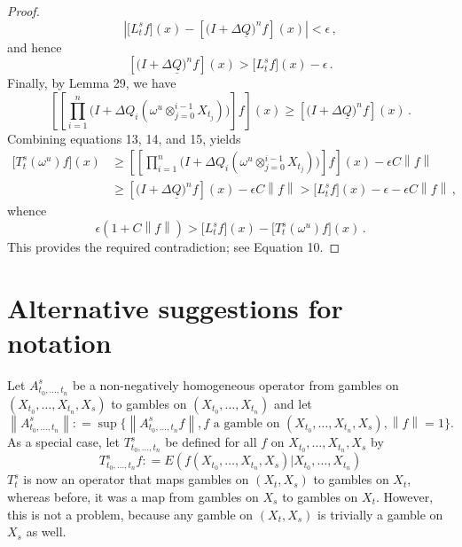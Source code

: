 \documentclass[a4paper,reqno]{amsart}
\newcommand{\lrate}{\underline{Q}}
\newcommand{\norm}[1]{\left\lVert #1 \right\rVert}
\newcommand{\coloneqq}{:\!=}
\begin{document}
\begin{proof}
\begin{equation*}
\left\vert \bigl[L_t^sf\bigr](x) - \left[\bigl(I + \Delta\lrate\bigr)^n f\right](x)\right\vert < \epsilon\,,
\end{equation*}
and hence
\begin{equation}
\left[\bigl(I + \Delta\lrate\bigr)^n f\right](x) > \bigl[L_t^sf\bigr](x) - \epsilon\,.
\end{equation}
Finally, by Lemma 29, we have
\begin{equation}
\left[\left[\prod_{i=1}^n\bigl(I + \Delta Q_i(\omega^u\otimes_{j=0}^{i-1}X_{t_j})\bigr) \right]f\right](x) \geq \left[\bigl(I + \Delta\lrate\bigr)^n f\right](x)\,.
\end{equation}
Combining equations 13, 14, and 15, yields
\begin{align*}
\bigl[T_t^s(\omega^u)f\bigr](x) &\geq \left[\left[\prod_{i=1}^n\bigl(I + \Delta Q_i(\omega^u\otimes_{j=0}^{i-1}X_{t_j})\bigr) \right]f\right](x) - \epsilon C\norm{f} \\
 &\geq \left[\bigl(I + \Delta\lrate\bigr)^n f\right](x) - \epsilon C\norm{f} > \bigl[L_t^sf\bigr](x) - \epsilon - \epsilon C\norm{f}\,,
\end{align*}
whence
\begin{equation*}
\epsilon(1+C\norm{f})> \bigl[L_t^sf\bigr](x) - \bigl[T_t^s(\omega^u)f\bigr](x)\,.
\end{equation*}
This provides the required contradiction; see Equation 10.
\end{proof}

\newpage
\section{Alternative suggestions for notation}

Let $A^s_{t_0,\dots,t_n}$ be a non-negatively homogeneous operator from gambles on $(X_{t_0},\dots,X_{t_n},X_s)$ to gambles on $(X_{t_0},\dots,X_{t_n})$
and let
\begin{equation*}
\norm{A^s_{t_0,\dots,t_n}}\coloneqq\sup\Big\{\norm{A^s_{t_0,\dots,t_n}f}, \text{$f$ a gamble on $(X_{t_0},\dots,X_{t_n},X_s)$}, \norm{f}=1\Big\}.
\end{equation*}
As a special case, let $T^s_{t_0,\dots,t_n}$ be defined for all $f$ on $X_{t_0},\dots,X_{t_n},X_s$ by
\begin{equation*}
T^s_{t_0,\dots,t_n}f\coloneqq E(f(X_{t_0},\dots,X_{t_n},X_s)\vert X_{t_0},\dots,X_{t_n})
\end{equation*}
$T^s_t$ is now an operator that maps gambles on $(X_t,X_s)$ to gambles on $X_t$, whereas before, it was a map from gambles on $X_s$ to gambles on $X_t$. However, this is not a problem, because any gamble on $(X_t,X_s)$ is trivially a gamble on $X_s$ as well.
\end{document}
